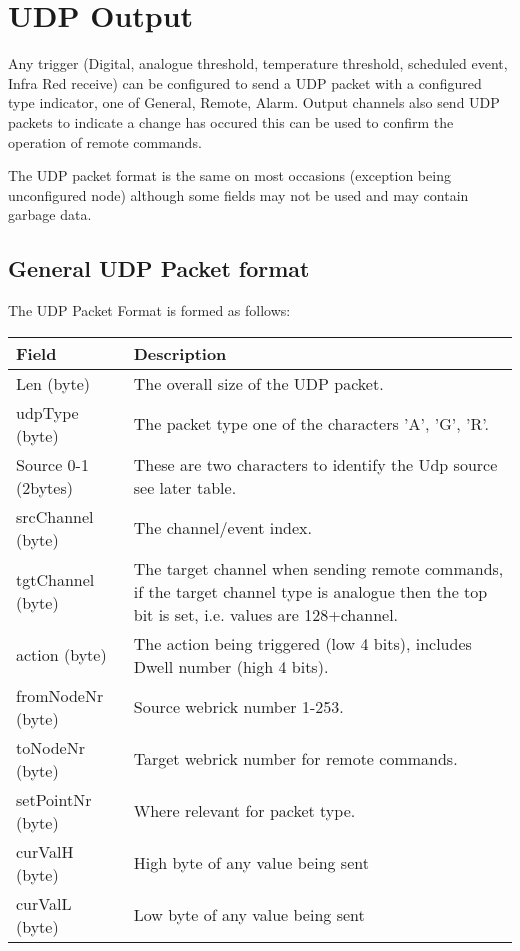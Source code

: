 \section{UDP Output}

Any trigger (Digital, analogue threshold, temperature threshold, scheduled event, Infra Red receive) 
can be configured to send a 
UDP packet with a configured type indicator, one of General, Remote, Alarm. Output channels also send UDP packets 
to indicate a change has occured this can be used to confirm the operation of remote commands.

The UDP packet format is the same on most occasions (exception being unconfigured node) 
although some fields may not be used and may contain garbage data.

\subsection{General UDP Packet format}


The UDP Packet Format is formed as follows:

	\begin{tabular}{l|p{12cm}}
	Field&Description\\
    \hline
	Len (byte)&The overall size of the UDP packet.\\
	udpType (byte)&  The packet type one of the characters 'A', 'G', 'R'.\\
	Source 0-1 (2bytes)& These are two characters to identify the Udp source see later table.\\
	srcChannel (byte)& The channel/event index.\\
	tgtChannel (byte)& The target channel when sending remote commands, if the target channel type is analogue
			then the top bit is set, i.e. values are 128+channel.\\
	action (byte)& The action being triggered (low 4 bits), includes Dwell number (high 4 bits).\\
	fromNodeNr (byte)& Source webrick number 1-253.\\
	toNodeNr (byte)& Target webrick number for remote commands.\\
	setPointNr (byte)& Where relevant for packet type.\\
	curValH (byte)& High byte of any value being sent\\
	curValL (byte)& Low byte of any value being sent\\
	\end{tabular}

